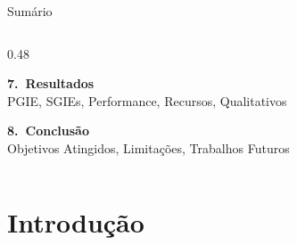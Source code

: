 {\begin{frame}{Sum\'{a}rio}
\begin{columns}[T]
\begin{column}{0.48\textwidth}
      \vspace{3mm}

      {\small\color{skipcolor}\textbf{7.\ Resultados}}\\[2pt]
      {\scriptsize\color{sublabelcolor}
        \quad PGIE, SGIEs, Performance, Recursos, Qualitativos}

      \vspace{3mm}

      {\small\color{stagecolor}\textbf{8.\ Conclus\~{a}o}}\\[2pt]
      {\scriptsize\color{sublabelcolor}
        \quad Objetivos Atingidos, Limita\c{c}\~{o}es, Trabalhos Futuros}
    \end{column}
  \end{columns}
  \vfill
\end{frame}
}%

\section{Introdu\c{c}\~{a}o}

